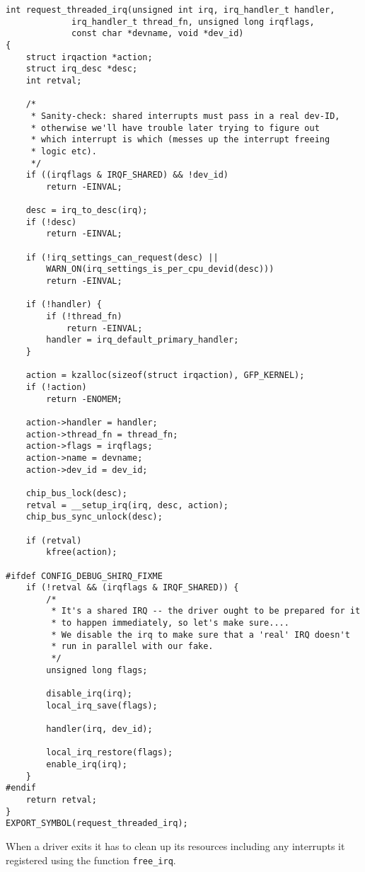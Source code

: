 \documentclass[10pt,conference,draftclsnofoot,onecolumn]{IEEEtran}
\begin{document}
\begin{lstlisting}
int request_threaded_irq(unsigned int irq, irq_handler_t handler,
			 irq_handler_t thread_fn, unsigned long irqflags,
			 const char *devname, void *dev_id)
{
	struct irqaction *action;
	struct irq_desc *desc;
	int retval;

	/*
	 * Sanity-check: shared interrupts must pass in a real dev-ID,
	 * otherwise we'll have trouble later trying to figure out
	 * which interrupt is which (messes up the interrupt freeing
	 * logic etc).
	 */
	if ((irqflags & IRQF_SHARED) && !dev_id)
		return -EINVAL;

	desc = irq_to_desc(irq);
	if (!desc)
		return -EINVAL;

	if (!irq_settings_can_request(desc) ||
	    WARN_ON(irq_settings_is_per_cpu_devid(desc)))
		return -EINVAL;

	if (!handler) {
		if (!thread_fn)
			return -EINVAL;
		handler = irq_default_primary_handler;
	}

	action = kzalloc(sizeof(struct irqaction), GFP_KERNEL);
	if (!action)
		return -ENOMEM;

	action->handler = handler;
	action->thread_fn = thread_fn;
	action->flags = irqflags;
	action->name = devname;
	action->dev_id = dev_id;

	chip_bus_lock(desc);
	retval = __setup_irq(irq, desc, action);
	chip_bus_sync_unlock(desc);

	if (retval)
		kfree(action);

#ifdef CONFIG_DEBUG_SHIRQ_FIXME
	if (!retval && (irqflags & IRQF_SHARED)) {
		/*
		 * It's a shared IRQ -- the driver ought to be prepared for it
		 * to happen immediately, so let's make sure....
		 * We disable the irq to make sure that a 'real' IRQ doesn't
		 * run in parallel with our fake.
		 */
		unsigned long flags;

		disable_irq(irq);
		local_irq_save(flags);

		handler(irq, dev_id);

		local_irq_restore(flags);
		enable_irq(irq);
	}
#endif
	return retval;
}
EXPORT_SYMBOL(request_threaded_irq);
\end{lstlisting}\cite{5_torvalds_2016}

When a driver exits it has to clean up its resources including any interrupts it registered using the function \texttt{free\_irq}.
\end{document}
